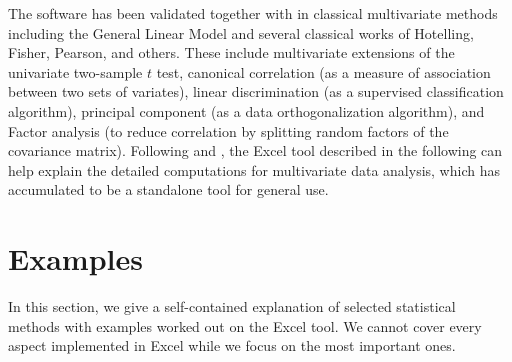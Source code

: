 \documentclass[article]{jss}
\begin{document}
  
        The software has been validated together with  in classical multivariate methods including the General Linear Model and several classical works of Hotelling, Fisher, Pearson, and others. These include multivariate extensions of the univariate two-sample $t$ test, canonical correlation (as a measure of association between two sets of variates), linear discrimination (as a supervised classification algorithm),  principal component (as a data orthogonalization algorithm), and Factor analysis (to reduce correlation by splitting random factors of the covariance matrix). Following \cite{anderson2003introMVA3e} and \cite{johnson1992applied}, the Excel tool described in the following can help explain the detailed computations for multivariate data analysis, which has accumulated to be a standalone tool for general use.
  
  
        \section[example]{Examples}
        
        
            In this section, we give a self-contained explanation of selected statistical methods with examples worked out on the Excel tool. We cannot cover every aspect implemented in Excel while we focus on the most important ones.
        
        
\end{document}
